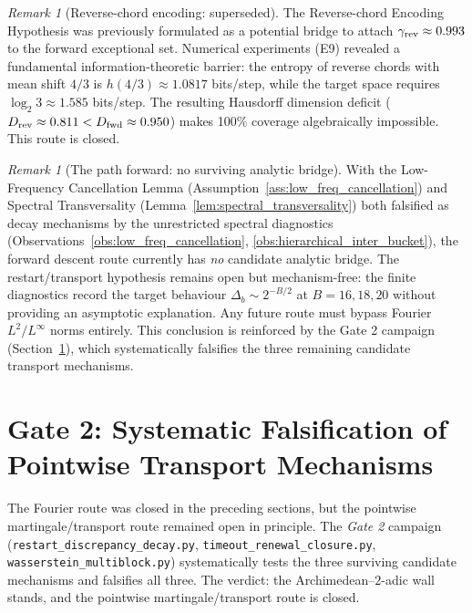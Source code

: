 \documentclass[12pt,a4paper]{article}
\theoremstyle{remark}
\newtheorem{remark}[theorem]{Remark}
\begin{document}
\begin{remark}[Reverse-chord encoding: superseded]
\label{rem:reverse_encoding_superseded}
The Reverse-chord Encoding Hypothesis was previously formulated as a
potential bridge to attach $\gamma_{\rm rev} \approx 0.993$ to the forward
exceptional set. Numerical experiments (E9) revealed a fundamental
information-theoretic barrier: the entropy of reverse chords with mean
shift $4/3$ is $h(4/3) \approx 1.0817$ bits/step, while the target space
requires $\log_2 3 \approx 1.585$ bits/step. The resulting Hausdorff
dimension deficit ($D_{\rm rev} \approx 0.811 < D_{\rm fwd} \approx 0.950$)
makes 100\% coverage algebraically impossible. This route is closed.
\end{remark}
\begin{remark}[The path forward: no surviving analytic bridge]
With the Low-Frequency Cancellation Lemma (Assumption~\ref{ass:low_freq_cancellation})
and Spectral Transversality (Lemma~\ref{lem:spectral_transversality}) both
falsified as decay mechanisms by the unrestricted spectral diagnostics
(Observations~\ref{obs:low_freq_cancellation}, \ref{obs:hierarchical_inter_bucket}),
the forward descent route currently has \emph{no} candidate analytic bridge.
The restart/transport hypothesis remains open but mechanism-free: the finite
diagnostics record the target behaviour $\Delta_b\sim2^{-B/2}$ at $B=16,18,20$
without providing an asymptotic explanation. Any future route must bypass
Fourier $L^2/L^\infty$ norms entirely. This conclusion is reinforced by the
Gate 2 campaign (Section~\ref{sec:gate2}), which systematically falsifies the
three remaining candidate transport mechanisms.
\end{remark}

\section{Gate 2: Systematic Falsification of Pointwise Transport Mechanisms}
\label{sec:gate2}

The Fourier route was closed in the preceding sections, but the pointwise
martingale/transport route remained open in principle. The \emph{Gate 2}
campaign (\texttt{restart\_discrepancy\_decay.py},
\texttt{timeout\_renewal\_closure.py}, \texttt{wasserstein\_multiblock.py})
systematically tests the three surviving candidate mechanisms and falsifies all
three. The verdict: the Archimedean--$2$-adic wall stands, and the pointwise
martingale/transport route is closed.
\end{document}
